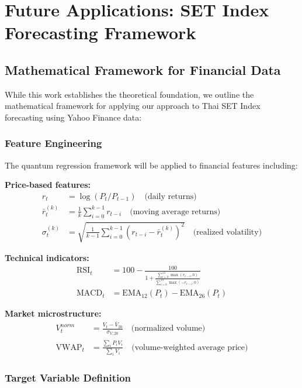 \documentclass[11pt]{article}
\begin{document}
\section{Future Applications: SET Index Forecasting Framework}

\subsection{Mathematical Framework for Financial Data}

While this work establishes the theoretical foundation, we outline the mathematical framework for applying our approach to Thai SET Index forecasting using Yahoo Finance data:

\subsubsection{Feature Engineering}

The quantum regression framework will be applied to financial features including:

\textbf{Price-based features:}
\begin{align}
r_t &= \log(P_t / P_{t-1}) \quad \text{(daily returns)} \\
\bar{r}_t^{(k)} &= \frac{1}{k} \sum_{i=0}^{k-1} r_{t-i} \quad \text{(moving average returns)} \\
\sigma_t^{(k)} &= \sqrt{\frac{1}{k-1} \sum_{i=0}^{k-1} (r_{t-i} - \bar{r}_t^{(k)})^2} \quad \text{(realized volatility)}
\end{align}

\textbf{Technical indicators:}
\begin{align}
\text{RSI}_t &= 100 - \frac{100}{1 + \frac{\sum_{i=0}^{13} \max(r_{t-i}, 0)}{\sum_{i=0}^{13} \max(-r_{t-i}, 0)}} \\
\text{MACD}_t &= \text{EMA}_{12}(P_t) - \text{EMA}_{26}(P_t)
\end{align}

\textbf{Market microstructure:}
\begin{align}
V_t^{norm} &= \frac{V_t - \bar{V}_{20}}{\sigma_{V,20}} \quad \text{(normalized volume)} \\
\text{VWAP}_t &= \frac{\sum_{i} P_i V_i}{\sum_{i} V_i} \quad \text{(volume-weighted average price)}
\end{align}

\subsubsection{Target Variable Definition}
\end{document}
